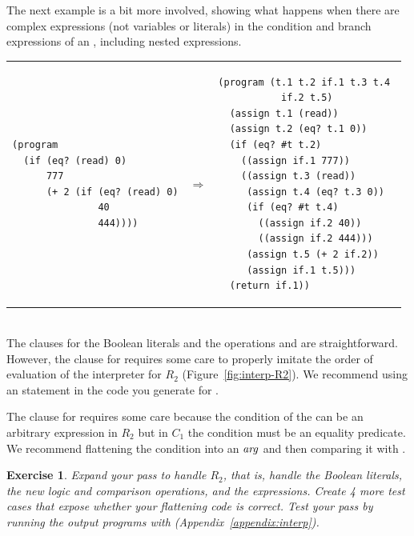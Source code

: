 \documentclass[11pt]{book}
\newtheorem{exercise}[theorem]{Exercise}
\begin{document}
The next example is a bit more involved, showing what happens when
there are complex expressions (not variables or literals) in the
condition and branch expressions of an , including nested
 expressions.

\begin{tabular}{lll}
\begin{minipage}{0.4\textwidth}
\begin{lstlisting}
(program
  (if (eq? (read) 0)
      777
      (+ 2 (if (eq? (read) 0)
               40
               444))))
\end{lstlisting}
\end{minipage}
&
$\Rightarrow$
&
\begin{minipage}{0.4\textwidth}
\begin{lstlisting}
(program (t.1 t.2 if.1 t.3 t.4 
           if.2 t.5)
  (assign t.1 (read))
  (assign t.2 (eq? t.1 0))
  (if (eq? #t t.2)
    ((assign if.1 777))
    ((assign t.3 (read))
     (assign t.4 (eq? t.3 0))
     (if (eq? #t t.4)
       ((assign if.2 40))
       ((assign if.2 444)))
     (assign t.5 (+ 2 if.2))
     (assign if.1 t.5)))
  (return if.1))
\end{lstlisting}
\end{minipage}
\end{tabular} \\

The  clauses for the Boolean literals and the operations
 and  are straightforward.  However, the
 clause for  requires some care to properly
imitate the order of evaluation of the interpreter for $R_2$
(Figure~\ref{fig:interp-R2}). We recommend using an  statement
in the code you generate for .

The  clause for  requires some care because the
condition of the  can be an arbitrary expression in $R_2$ but
in $C_1$ the condition must be an equality predicate. We recommend
flattening the condition into an $\mathit{arg}$ and then comparing it with
.

\begin{exercise}\normalfont
Expand your  pass to handle $R_2$, that is, handle the
Boolean literals, the new logic and comparison operations, and the
 expressions. Create 4 more test cases that expose whether
your flattening code is correct. Test your  pass by
running the output programs with 
(Appendix~\ref{appendix:interp}).
\end{exercise}
\end{document}
